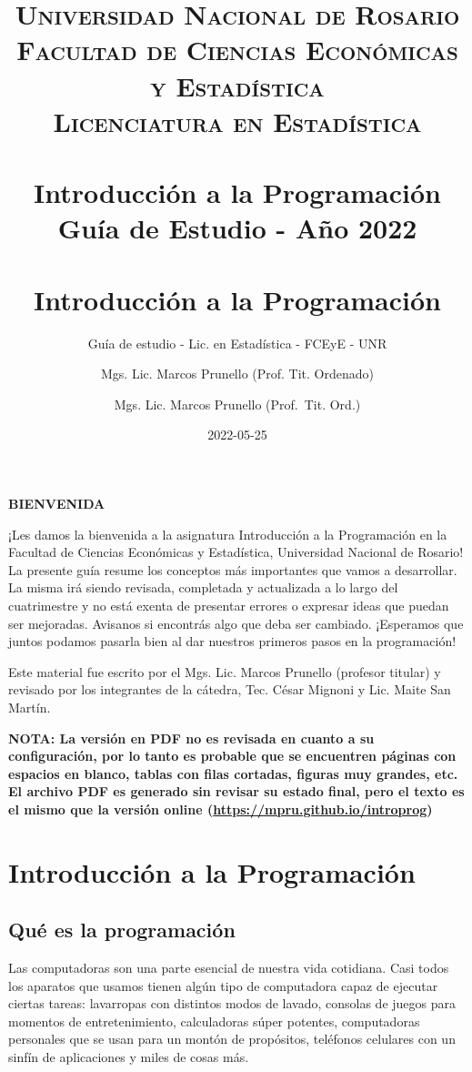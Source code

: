 \documentclass[
]{book}
\title{
	\usefont{OT1}{bch}{b}{n}
	\normalfont \normalsize
	\textsc{
		Universidad Nacional de Rosario \\
		Facultad de Ciencias Económicas y Estadística \\
		Licenciatura en Estadística
	} \\ [25pt]
	\horrule{2pt} \\[0.4cm]
	\huge \textbf{Introducción a la Programación} \\
	\bigbreak
	Guía de Estudio - Año 2022\\
	\horrule{2pt} \\[0.5cm]}
\author{
	\normalfont Mgs. Lic. Marcos Prunello (Prof. Tit. Ordenado)
}
\title{Introducción a la Programación}
\subtitle{Guía de estudio - Lic. en Estadística - FCEyE - UNR}
\author{Mgs. Lic. Marcos Prunello (Prof.~Tit. Ord.)}
\date{2022-05-25}
\begin{document}
\maketitle

{
\setcounter{tocdepth}{1}
\tableofcontents
}
\newpage

\textbf{BIENVENIDA}

\vspace{\baselineskip}

¡Les damos la bienvenida a la asignatura Introducción a la Programación en la Facultad de Ciencias Económicas y Estadística, Universidad Nacional de Rosario! La presente guía resume los conceptos más importantes que vamos a desarrollar. La misma irá siendo revisada, completada y actualizada a lo largo del cuatrimestre y no está exenta de presentar errores o expresar ideas que puedan ser mejoradas. Avisanos si encontrás algo que deba ser cambiado. ¡Esperamos que juntos podamos pasarla bien al dar nuestros primeros pasos en la programación!

\vspace{\baselineskip}

Este material fue escrito por el Mgs. Lic. Marcos Prunello (profesor titular) y revisado por los integrantes de la cátedra, Tec. César Mignoni y Lic. Maite San Martín.

\vspace{\baselineskip}

\textbf{NOTA: La versión en PDF no es revisada en cuanto a su configuración, por lo tanto es probable que se encuentren páginas con espacios en blanco, tablas con filas cortadas, figuras muy grandes, etc. El archivo PDF es generado sin revisar su estado final, pero el texto es el mismo que la versión online (\url{https://mpru.github.io/introprog})}

\hypertarget{introducciuxf3n-a-la-programaciuxf3n}{%
\chapter{Introducción a la Programación}\label{introducciuxf3n-a-la-programaciuxf3n}}

\hypertarget{quuxe9-es-la-programaciuxf3n}{%
\section{Qué es la programación}\label{quuxe9-es-la-programaciuxf3n}}

Las computadoras son una parte esencial de nuestra vida cotidiana. Casi todos los aparatos que usamos tienen algún tipo de computadora capaz de ejecutar ciertas tareas: lavarropas con distintos modos de lavado, consolas de juegos para momentos de entretenimiento, calculadoras súper potentes, computadoras personales que se usan para un montón de propósitos, teléfonos celulares con un sinfín de aplicaciones y miles de cosas más.
\end{document}
